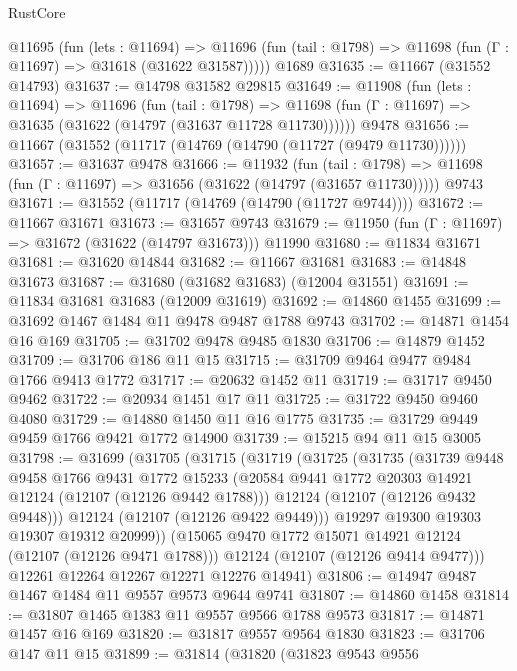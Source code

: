 \begin{lexlean}{RustCore}
\begin{coremodule}
    @11695
      (fun (lets : @11694) =>
      @11696 (fun (tail : @1798) => @11698 (fun (Γ : @11697) => @31618 (@31622 @31587)))))
    @1689
@31635 := @11667 (@31552 @14793)
@31637 := @14798 @31582 @29815
@31649 := @11908
    (fun (lets : @11694) =>
    @11696
      (fun (tail : @1798) =>
      @11698 (fun (Γ : @11697) => @31635 (@31622 (@14797 (@31637 @11728 @11730))))))
    @9478
@31656 := @11667 (@31552 (@11717 (@14769 (@14790 (@11727 (@9479 @11730))))))
@31657 := @31637 @9478
@31666 := @11932
    (fun (tail : @1798) => @11698 (fun (Γ : @11697) => @31656 (@31622 (@14797 (@31657 @11730)))))
    @9743
@31671 := @31552 (@11717 (@14769 (@14790 (@11727 @9744))))
@31672 := @11667 @31671
@31673 := @31657 @9743
@31679 := @11950 (fun (Γ : @11697) => @31672 (@31622 (@14797 @31673))) @11990
@31680 := @11834 @31671
@31681 := @31620 @14844
@31682 := @11667 @31681
@31683 := @14848 @31673
@31687 := @31680 (@31682 @31683) (@12004 @31551)
@31691 := @11834 @31681 @31683 (@12009 @31619)
@31692 := @14860 @1455
@31699 := @31692 @1467 @1484 @11 @9478 @9487 @1788 @9743
@31702 := @14871 @1454 @16 @169
@31705 := @31702 @9478 @9485 @1830
@31706 := @14879 @1452
@31709 := @31706 @186 @11 @15
@31715 := @31709 @9464 @9477 @9484 @1766 @9413 @1772
@31717 := @20632 @1452 @11
@31719 := @31717 @9450 @9462
@31722 := @20934 @1451 @17 @11
@31725 := @31722 @9450 @9460 @4080
@31729 := @14880 @1450 @11 @16 @1775
@31735 := @31729 @9449 @9459 @1766 @9421 @1772 @14900
@31739 := @15215 @94 @11 @15 @3005
@31798 := @31699
    (@31705
      (@31715
        (@31719
          (@31725
            (@31735
              (@31739
                @9448
                @9458
                @1766
                @9431
                @1772
                @15233
                (@20584 @9441 @1772 @20303 @14921 @12124 (@12107 (@12126 @9442 @1788)))
                @12124
                (@12107 (@12126 @9432 @9448)))
              @12124
              (@12107 (@12126 @9422 @9449)))
            @19297
            @19300
            @19303
            @19307
            @19312
            @20999))
        (@15065 @9470 @1772 @15071 @14921 @12124 (@12107 (@12126 @9471 @1788)))
        @12124
        (@12107 (@12126 @9414 @9477)))
      @12261
      @12264
      @12267
      @12271
      @12276
      @14941)
@31806 := @14947 @9487 @1467 @1484 @11 @9557 @9573 @9644 @9741
@31807 := @14860 @1458
@31814 := @31807 @1465 @1383 @11 @9557 @9566 @1788 @9573
@31817 := @14871 @1457 @16 @169
@31820 := @31817 @9557 @9564 @1830
@31823 := @31706 @147 @11 @15
@31899 := @31814
    (@31820
      (@31823
        @9543
        @9556

\end{coremodule}
\end{lexlean}
